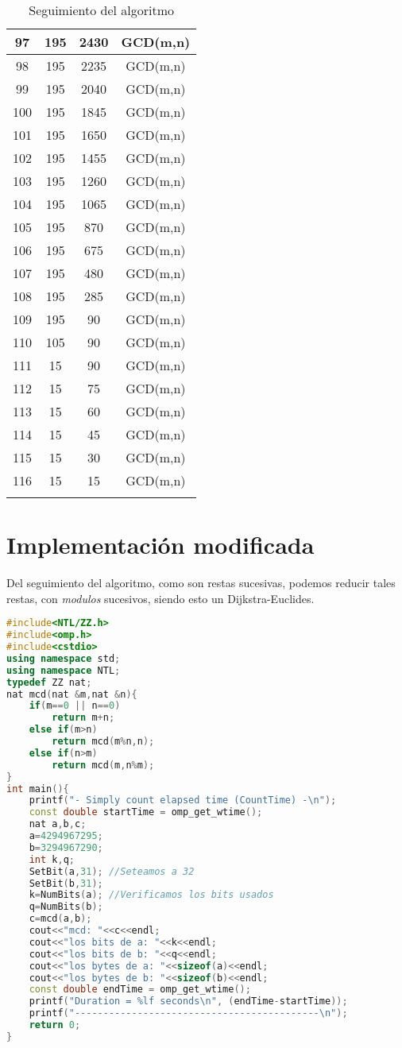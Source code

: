 \begin{longtable}{c|c|c|c}
97&195&2430&GCD(m,n)\\\hline
98&195&2235&GCD(m,n)\\\hline
99&195&2040&GCD(m,n)\\\hline
100&195&1845&GCD(m,n)\\\hline
101&195&1650&GCD(m,n)\\\hline
102&195&1455&GCD(m,n)\\\hline
103&195&1260&GCD(m,n)\\\hline
104&195&1065&GCD(m,n)\\\hline
105&195&870&GCD(m,n)\\\hline
106&195&675&GCD(m,n)\\\hline
107&195&480&GCD(m,n)\\\hline
108&195&285&GCD(m,n)\\\hline
109&195&90&GCD(m,n)\\\hline
110&105&90&GCD(m,n)\\\hline
111&15&90&GCD(m,n)\\\hline
112&15&75&GCD(m,n)\\\hline
113&15&60&GCD(m,n)\\\hline
114&15&45&GCD(m,n)\\\hline
115&15&30&GCD(m,n)\\\hline
116&15&15&GCD(m,n)\\\hline
\caption{Seguimiento del algoritmo}
\label{ta:morse}
\end{longtable}

\section{Implementaci\'on modificada}
Del seguimiento del algoritmo, como son restas sucesivas, podemos reducir tales restas, con \emph{modulos} sucesivos, siendo esto un Dijkstra-Euclides.
\begin{lstlisting}[language=C++]
#include<NTL/ZZ.h>
#include<omp.h>
#include<cstdio>
using namespace std;
using namespace NTL;
typedef ZZ nat;
nat mcd(nat &m,nat &n){
    if(m==0 || n==0)
        return m+n;
    else if(m>n)
        return mcd(m%n,n);
    else if(n>m)
        return mcd(m,n%m);
}
int main(){
    printf("- Simply count elapsed time (CountTime) -\n");
    const double startTime = omp_get_wtime();
    nat a,b,c;
    a=4294967295;
    b=3294967290;
    int k,q;
    SetBit(a,31); //Seteamos a 32
    SetBit(b,31);
    k=NumBits(a); //Verificamos los bits usados
    q=NumBits(b);
    c=mcd(a,b);
    cout<<"mcd: "<<c<<endl;
    cout<<"los bits de a: "<<k<<endl;
    cout<<"los bits de b: "<<q<<endl;
    cout<<"los bytes de a: "<<sizeof(a)<<endl;
    cout<<"los bytes de b: "<<sizeof(b)<<endl;
    const double endTime = omp_get_wtime();
    printf("Duration = %lf seconds\n", (endTime-startTime));
    printf("-------------------------------------------\n");
    return 0;
}
\end{lstlisting}

